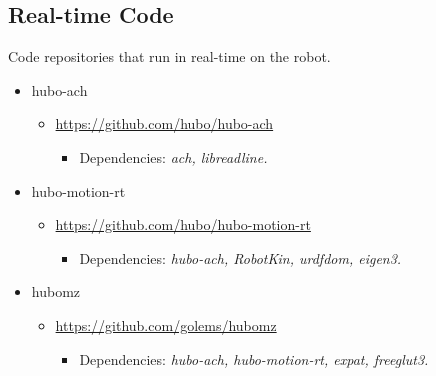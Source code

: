 \documentclass[letterpaper, 10 pt]{report}
\begin{document}
\subsection*{Real-time Code}
Code repositories that run in real-time on the robot.
\begin{itemize}
\item hubo-ach
  \begin{itemize}
	\item \url{https://github.com/hubo/hubo-ach}
	  \begin{itemize}
	    \item Dependencies: \textit{ach, libreadline.}
	  \end{itemize}
  \end{itemize}
\item hubo-motion-rt
	\begin{itemize}
	\item \url{https://github.com/hubo/hubo-motion-rt}
	  \begin{itemize}
	    \item Dependencies: \textit{hubo-ach, RobotKin, urdfdom, eigen3.}
	  \end{itemize}
  \end{itemize}
\item hubomz
  \begin{itemize}
	\item \url{https://github.com/golems/hubomz}
	  \begin{itemize}
	    \item Dependencies: \textit{hubo-ach, hubo-motion-rt, expat, freeglut3.} 
	  \end{itemize}
  \end{itemize}
\end{itemize}
\end{document}

